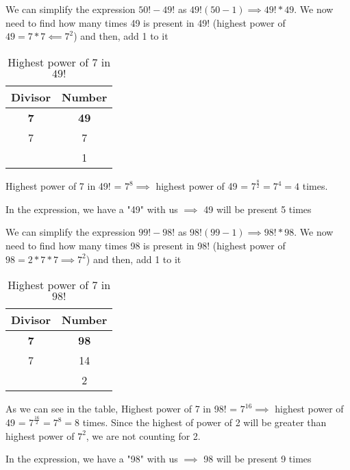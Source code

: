 We can simplify the expression $50! - 49!$ as $49! (50-1) \implies 49! * 49$. We now need to find how many times 49 is present in 49! (highest power of $49 = 7 * 7 \impliedby 7^2$) and then, add 1 to it

\begin{table}[ht!]
    \centering
    \begin{tabular}{|| c | c ||}
         \hline
         Divisor & Number  \\
         \hline
         \textbf{7} & \textbf{49} \\ 
         7 & 7 \\ 
           & 1 \\ 
         \hline
    \end{tabular}
    \caption{Highest power of 7 in $49!$}
\end{table}

Highest power of 7 in 49! = $7^8 \implies$ highest power of 49 = $7^{\frac{8}{2}} = 7^4 = 4$ times.

In the expression, we have a "49" with us $\implies$ 49 will be present 5 times


We can simplify the expression $99! - 98!$ as $98! (99-1) \implies 98! * 98$. We now need to find how many times 98 is present in 98! (highest power of $98 = 2 * 7 * 7 \implies 7^2$) and then, add 1 to it

\newpage

\begin{table}[ht!]
    \centering
    \begin{tabular}{|| c | c ||}
         \hline
         Divisor & Number  \\
         \hline
         \textbf{7} & \textbf{98} \\ 
         7 & 14 \\ 
           & 2 \\ 
         \hline
    \end{tabular}
    \caption{Highest power of 7 in $98!$}
\end{table}

As we can see in the table, Highest power of 7 in 98! = $7^16 \implies$ highest power of 49 = $7^{\frac{16}{2}} = 7^8 = 8$ times. Since the highest of power of 2 will be greater than highest power of $7^2$, we are not counting for 2.

In the expression, we have a "98" with us $\implies$ 98 will be present 9 times

